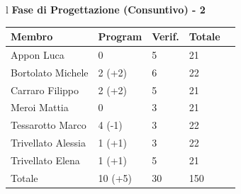 \documentclass[11pt,titlepage,a4paper]{report}
\begin{document}
\begin{table}[hbtp]
\large{
\begin{tabular}{l}
\Large{\textbf{\textsf{Fase di Progettazione (Consuntivo) - 2}}} \\
\begin{tabular}{||p{3.5cm}||p{2cm}||p{2cm}||p{2cm}||p{2cm}||}
\hline

\textbf{Membro} & \textbf{Program} & \textbf{Verif.} & \textbf{Totale}\\
\hline
{Appon Luca}&0&5&21 \\ 
\hline 
{Bortolato Michele} &2 \footnotesize{(+2)}&6&22\\ 
\hline
{Carraro Filippo}&2 \footnotesize{(+2)}&5&21 \\
\hline
{Meroi Mattia}&0&3&21\\
\hline
{Tessarotto Marco} &4 \footnotesize{(-1)}&3&22\\
\hline
{Trivellato Alessia} &1 \footnotesize{(+1)}&3&22 \\
\hline
{Trivellato Elena} &1 \footnotesize{(+1)}&5&21 \\
\hline
{Totale}&10 \footnotesize{(+5)}&30&150 \\
\hline

\end{tabular} \\
\end{tabular}
}
\end{table}
\end{document}
